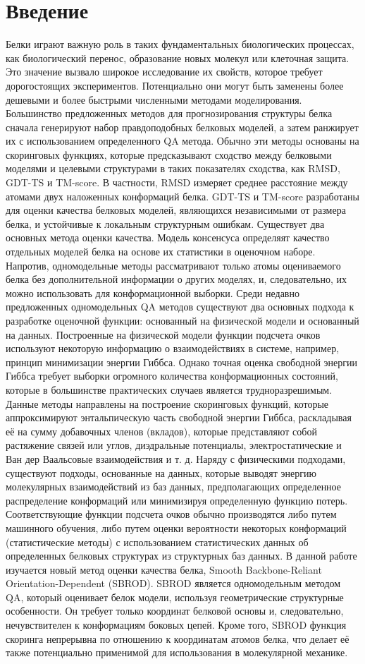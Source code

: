 \documentclass[12pt,twoside]{article}
\begin{document}
\section{Введение}
Белки играют важную роль в таких фундаментальных биологических процессах, как биологический перенос, образование новых молекул или клеточная защита. Это значение вызвало широкое исследование их свойств, которое требует дорогостоящих экспериментов. Потенциально они могут быть заменены более дешевыми и более быстрыми численными методами моделирования. Большинство предложенных методов для прогнозирования структуры белка сначала генерируют набор правдоподобных белковых моделей, а затем ранжирует их с использованием определенного QA метода. Обычно эти методы основаны на скоринговых функциях, которые предсказывают сходство между белковыми моделями и целевыми структурами в таких показателях сходства, как RMSD, GDT-TS и TM-score. В частности, RMSD измеряет среднее расстояние между атомами двух наложенных конформаций белка. GDT-TS и TM-score разработаны для оценки качества белковых моделей, являющихся независимыми от размера белка, и устойчивые к локальным структурным ошибкам. Существует два основных метода оценки качества. Модель консенсуса определяят качество отдельных моделей белка на основе их статистики в оценочном наборе. Напротив, одномодельные методы рассматривают только атомы оцениваемого белка без дополнительной информации о других моделях, и, следовательно, их можно использовать для конформационной выборки. Среди недавно предложенных одномодельных QA методов существуют два основных подхода к разработке оценочной функции: основанный на физической модели и основанный на данных. Построенные на физической модели функции подсчета очков используют некоторую информацию о взаимодействиях в системе, например, принцип минимизации энергии Гиббса. Однако точная оценка свободной энергии Гиббса требует выборки огромного количества конформационных состояний, которые в большинстве практических случаев является трудноразрешимым. Данные методы направлены на построение скоринговых функций, которые аппроксимируют энтальпическую часть свободной энергии Гиббса, раскладывая её на сумму добавочных членов (вкладов), которые представляют собой растяжение связей или углов, диэдральные потенциалы, электростатические и Ван дер Ваальсовые взаимодействия и т. д. Наряду с физическими подходами, существуют подходы, основанные на данных, которые выводят энергию молекулярных взаимодействий из баз данных, предполагающих определенное распределение конформаций или минимизируя определенную функцию потерь. Соответствующие функции подсчета очков обычно производятся либо путем машинного обучения, либо путем оценки вероятности некоторых конформаций (статистические методы) с использованием статистических данных об определенных белковых структурах из структурных баз данных. В данной работе изучается новый метод оценки качества белка, Smooth Backbone-Reliant Orientation-Dependent (SBROD). SBROD является одномодельным методом QA, который оценивает белок модели, используя геометрические структурные особенности. Он требует только координат белковой основы и, следовательно, нечувствителен к конформациям боковых цепей. Кроме того, SBROD функция скоринга непрерывна по отношению к координатам атомов белка, что делает её также потенциально применимой для использования в молекулярной механике.
\bigskip
\nocite{*}


\end{document}
